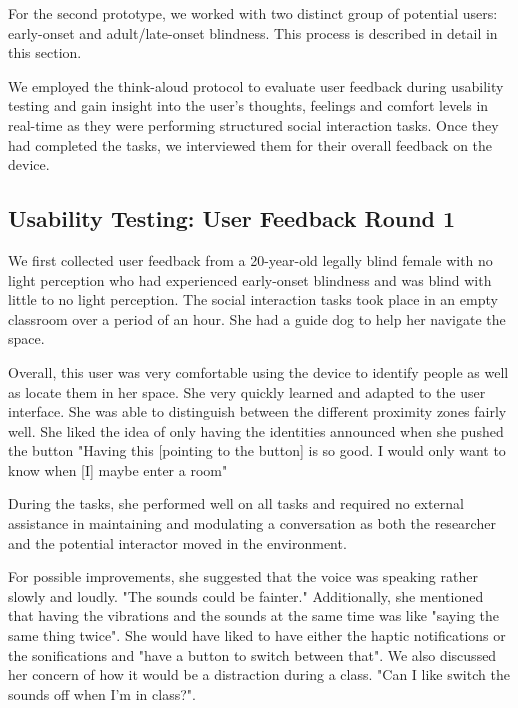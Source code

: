 For the second prototype, we worked with two distinct group of potential users: early-onset and adult/late-onset blindness. This process is described in detail in this section.

We employed the think-aloud protocol to evaluate user feedback during usability testing and gain insight into the user's thoughts, feelings and comfort levels in real-time as they were performing structured social interaction tasks. Once they had completed the tasks, we interviewed them for their overall feedback on the device. 

\subsection{Usability Testing: User Feedback Round 1}

We first collected user feedback from a 20-year-old legally blind female with no light perception who had experienced early-onset blindness and was blind with little to no light perception. The social interaction tasks took place in an empty classroom over a period of an hour. She had a guide dog to help her navigate the space.  


Overall, this user was very comfortable using the device to identify people as well as locate them in her space. She very quickly learned and adapted to the user interface. She was able to distinguish between the different proximity zones fairly well. She liked the idea of only having the identities announced when she pushed the button "Having this [pointing to the button] is so good. I would only want to know when [I] maybe enter a room" 
 
During the tasks, she performed well on all tasks and required no external assistance in maintaining and modulating a conversation as both the researcher and the potential interactor moved in the environment.
 
For possible improvements, she suggested that the voice was speaking rather slowly and loudly. "The sounds could be fainter." Additionally, she mentioned that having the vibrations and the sounds at the same time was like "saying the same thing twice". She would have liked to have either the haptic notifications or the sonifications and "have a button to switch between that".  We also discussed  her concern of how it would be a distraction during a class. "Can I like switch the sounds off when I'm in class?". 
 
